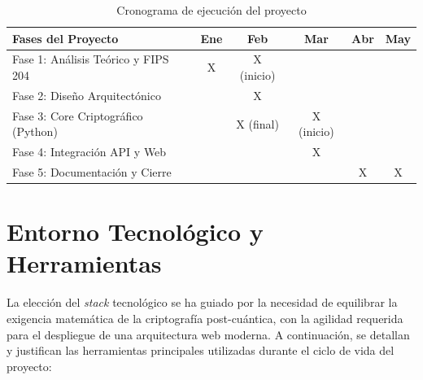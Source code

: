 \documentclass[11pt, a4paper]{report}
\theoremstyle{definition}
\begin{document}
\vspace{0.5cm}
\begin{table}[h]
\centering
\renewcommand{\arraystretch}{1.5}
\begin{tabular}{|l|c|c|c|c|c|}
\hline
\textbf{Fases del Proyecto} & \textbf{Ene} & \textbf{Feb} & \textbf{Mar} & \textbf{Abr} & \textbf{May} \\ \hline
Fase 1: Análisis Teórico y FIPS 204 & X & X (inicio) & & & \\ \hline
Fase 2: Diseño Arquitectónico & & X  & & & \\ \hline
Fase 3: Core Criptográfico (Python) & & X (final) & X (inicio) & & \\ \hline
Fase 4: Integración API y Web & & & X & & \\ \hline
Fase 5: Documentación y Cierre & & & & X & X \\ \hline
\end{tabular}
\caption{Cronograma de ejecución del proyecto}
\label{tab:cronograma}
\end{table}
\vspace{0.5cm}

\section{Entorno Tecnológico y Herramientas}

La elección del \textit{stack} tecnológico se ha guiado por la necesidad de equilibrar la exigencia matemática de la criptografía post-cuántica, con la agilidad requerida para el despliegue de una arquitectura web moderna. A continuación, se detallan y justifican las herramientas principales utilizadas durante el ciclo de vida del proyecto:
\end{document}
